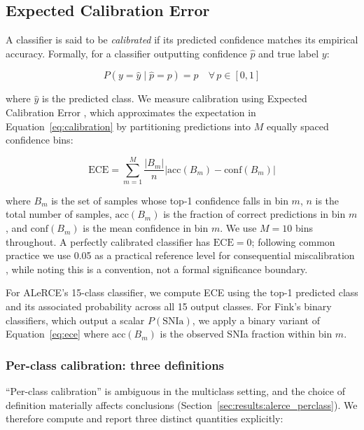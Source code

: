 \subsection{Expected Calibration Error}
\label{sec:methods:ece}

A classifier is said to be \textit{calibrated} if its predicted 
confidence matches its empirical accuracy. Formally, for a classifier 
outputting confidence $\hat{p}$ and true label $y$:

\begin{equation}
P(y = \hat{y} \mid \hat{p} = p) = p \quad \forall\, p \in [0, 1]
\label{eq:calibration}
\end{equation}

where $\hat{y}$ is the predicted class. We measure calibration using 
Expected Calibration Error \citep[ECE;][]{Naeini2015}, which 
approximates the expectation in Equation~\ref{eq:calibration} by 
partitioning predictions into $M$ equally spaced confidence bins:

\begin{equation}
\mathrm{ECE} = \sum_{m=1}^{M} \frac{|B_m|}{n} 
\left| \mathrm{acc}(B_m) - \mathrm{conf}(B_m) \right|
\label{eq:ece}
\end{equation}

where $B_m$ is the set of samples whose top-1 confidence falls in bin 
$m$, $n$ is the total number of samples, $\mathrm{acc}(B_m)$ is the 
fraction of correct predictions in bin $m$, and $\mathrm{conf}(B_m)$ 
is the mean confidence in bin $m$. We use $M = 10$ bins throughout. 
A perfectly calibrated classifier has $\mathrm{ECE} = 0$; following
common practice we use 0.05 as a practical reference level for
consequential miscalibration \citep{Guo2017}, while noting this is a
convention, not a formal significance boundary.

For ALeRCE's 15-class classifier, we compute ECE using the top-1
predicted class and its associated probability across all 15 output
classes. For Fink's binary classifiers, which output a scalar
$P(\mathrm{SNIa})$, we apply a binary variant of
Equation~\ref{eq:ece} where $\mathrm{acc}(B_m)$ is the observed
SNIa fraction within bin $m$.

\subsubsection{Per-class calibration: three definitions}
\label{sec:methods:perclass}

``Per-class calibration'' is ambiguous in the multiclass setting, and
the choice of definition materially affects conclusions
(Section~\ref{sec:results:alerce_perclass}). We therefore compute and
report three distinct quantities explicitly:

